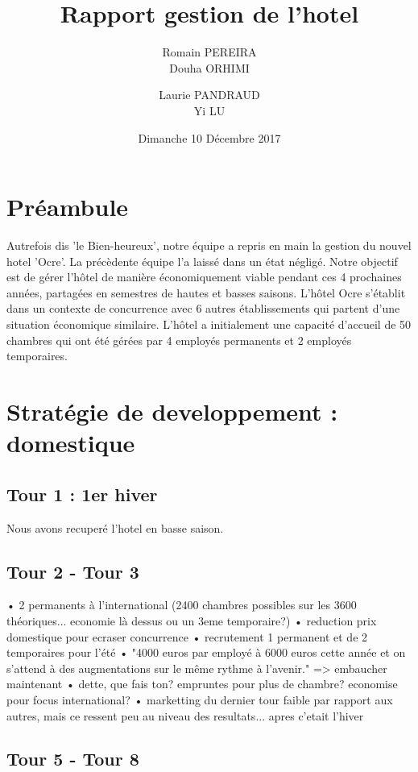 \documentclass[a4paper,10pt]{article}
\title{Rapport gestion de l'hotel}
\author{
  Romain PEREIRA\\
  \newline
  Douha ORHIMI\\
  \and
  Laurie PANDRAUD\\
  \newline
  Yi LU\\
}
\date{Dimanche 10 Décembre 2017}
\begin{document}
\maketitle
\tableofcontents
  \section{Préambule}
    Autrefois dis 'le Bien-heureux', notre équipe a repris en main la gestion du nouvel hotel 'Ocre'. La précèdente équipe l'a laissé dans un état négligé.
    Notre objectif est de gérer l'hôtel de manière économiquement viable pendant ces 4 prochaines années, partagées en semestres de hautes et basses saisons.
    \newline
    \newline
    L’hôtel Ocre s’établit dans un contexte de concurrence avec 6 autres établissements qui partent d’une situation économique similaire.
    L’hôtel a initialement une capacité d’accueil de 50 chambres qui ont été gérées par 4 employés permanents et 2 employés temporaires.
    \newline
  \newpage
  \section{Stratégie de developpement : domestique}
    \subsection{Tour 1 : 1er hiver}
      Nous avons recuperé l'hotel en basse saison.
    \subsection{Tour 2 - Tour 3}
      • 2 permanents à l'international (2400 chambres possibles sur les 3600 théoriques... economie là dessus ou un 3eme temporaire?)
      • reduction prix domestique pour ecraser concurrence
      • recrutement 1 permanent et de 2 temporaires pour l'été
      • "4000 euros par employé à 6000 euros cette année et on s'attend à des augmentations sur le même rythme à l'avenir." => embaucher maintenant
      • dette, que fais ton? empruntes pour plus de chambre? economise pour focus international?
      • marketting du dernier tour faible par rapport aux autres, mais ce ressent peu au niveau des resultats... apres c'etait l'hiver



    \subsection{Tour 5 - Tour 8}
     
\end{document}
